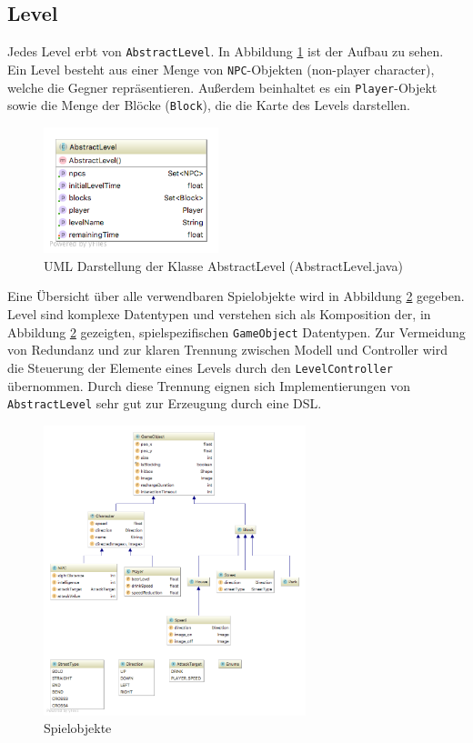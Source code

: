 \subsection{Level}
\label{sub:architektur:level}

Jedes Level erbt von \texttt{AbstractLevel}.
In Abbildung \ref{fig:spielarchitektur:abstractlevel} ist der Aufbau zu sehen.
Ein Level besteht aus einer Menge von \texttt{NPC}-Objekten (non-player character), welche die Gegner repräsentieren.
Außerdem beinhaltet es ein \texttt{Player}-Objekt sowie die Menge der Blöcke (\texttt{Block}), die die Karte des Levels darstellen.

\begin{figure}[H]
\centering
\includegraphics[width=2in]{img/05_abstractlevel_uml.png}
\caption{UML Darstellung der Klasse AbstractLevel (AbstractLevel.java)}
\label{fig:spielarchitektur:abstractlevel}
\end{figure}

Eine Übersicht über alle verwendbaren Spielobjekte wird in Abbildung \ref{fig:spielarchitektur:model} gegeben.
Level sind komplexe Datentypen und verstehen sich als Komposition der, in Abbildung \ref{fig:spielarchitektur:model} gezeigten, spielspezifischen \texttt{GameObject} Datentypen.
Zur Vermeidung von Redundanz und zur klaren Trennung zwischen Modell und Controller wird die Steuerung der Elemente eines Levels durch den \texttt{LevelController} übernommen.
Durch diese Trennung eignen sich Implementierungen von \texttt{AbstractLevel} sehr gut zur Erzeugung durch eine DSL.

\begin{figure}[H]
\centering
\includegraphics[width=3in]{img/05_model.png}
\caption{Spielobjekte}
\label{fig:spielarchitektur:model}
\end{figure}

